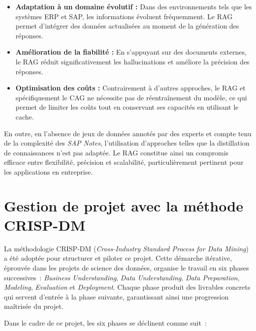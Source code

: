 \begin{itemize}[leftmargin=*, label=\textbullet]

  \item \textbf{Adaptation à un domaine évolutif :}
  Dans des environnements tels que les systèmes ERP et SAP, les informations évoluent fréquemment. Le RAG permet d'intégrer des données actualisées au moment de la génération des réponses.

  \item \textbf{Amélioration de la fiabilité :}
  En s'appuyant sur des documents externes, le RAG réduit significativement les hallucinations et améliore la précision des réponses.

  \item \textbf{Optimisation des coûts :}
  Contrairement à d'autres approches, le RAG et spécifiquement le CAG ne nécessite pas de réentraînement du modèle, ce qui permet de limiter les coûts tout en conservant ses capacités en utilisant le cache.

\end{itemize}

En outre, en l'absence de jeux de données annotés par des experts et compte tenu de la complexité des \textit{SAP Notes}, l'utilisation d'approches telles que la distillation de connaissances n'est pas adaptée. Le RAG constitue ainsi un compromis efficace entre flexibilité, précision et scalabilité, particulièrement pertinent pour les applications en entreprise.

\section{Gestion de projet avec la méthode CRISP-DM}
\label{sec:crisp_planification}

La méthodologie CRISP-DM (\textit{Cross-Industry Standard Process for Data Mining}) a été
adoptée pour structurer et piloter ce projet. Cette démarche itérative, éprouvée dans les
projets de science des données, organise le travail en six phases successives~:
\textit{Business Understanding}, \textit{Data Understanding}, \textit{Data Preparation},
\textit{Modeling}, \textit{Evaluation} et \textit{Deployment}. Chaque phase produit des
livrables concrets qui servent d'entrée à la phase suivante, garantissant ainsi une
progression maîtrisée du projet.

Dans le cadre de ce projet, les six phases se déclinent comme suit~:

